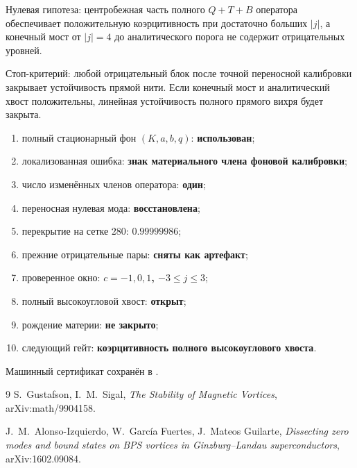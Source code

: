 Нулевая гипотеза: центробежная часть полного $Q+T+B$ оператора обеспечивает
положительную коэрцитивность при достаточно больших $|j|$, а конечный мост
от $|j|=4$ до аналитического порога не содержит отрицательных уровней.

Стоп-критерий: любой отрицательный блок после точной переносной калибровки
закрывает устойчивость прямой нити. Если конечный мост и аналитический хвост
положительны, линейная устойчивость полного прямого вихря будет закрыта.

\begin{protocol}
\begin{enumerate}
 \item полный стационарный фон $(K,a,b,q)$: \textbf{использован};
 \item локализованная ошибка: \textbf{знак материального члена фоновой калибровки};
 \item число изменённых членов оператора: \textbf{один};
 \item переносная нулевая мода: \textbf{восстановлена};
 \item перекрытие на сетке $280$: \textbf{$0.99999986$};
 \item прежние отрицательные пары: \textbf{сняты как артефакт};
 \item проверенное окно: \textbf{$c=-1,0,1$, $-3\le j\le3$};
 \item полный высокоугловой хвост: \textbf{открыт};
 \item рождение материи: \textbf{не закрыто};
 \item следующий гейт: \textbf{коэрцитивность полного высокоуглового хвоста}.
\end{enumerate}
\end{protocol}

Машинный сертификат сохранён в
.

\begin{thebibliography}{9}
S.~Gustafson, I.~M.~Sigal,
\emph{The Stability of Magnetic Vortices}, arXiv:math/9904158.

J.~M.~Alonso-Izquierdo, W.~Garc\'ia Fuertes, J.~Mateos Guilarte,
\emph{Dissecting zero modes and bound states on BPS vortices in
Ginzburg--Landau superconductors}, arXiv:1602.09084.
\end{thebibliography}